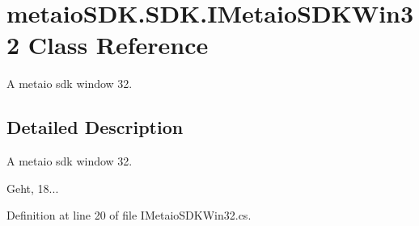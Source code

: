 \section{metaio\-S\-D\-K.\-S\-D\-K.\-I\-Metaio\-S\-D\-K\-Win32 Class Reference}
\label{classmetaio_s_d_k_1_1_s_d_k_1_1_i_metaio_s_d_k_win32}


A metaio sdk window 32.  




\subsection{Detailed Description}
A metaio sdk window 32. 

Geht, 18... 

Definition at line 20 of file I\-Metaio\-S\-D\-K\-Win32.\-cs.

